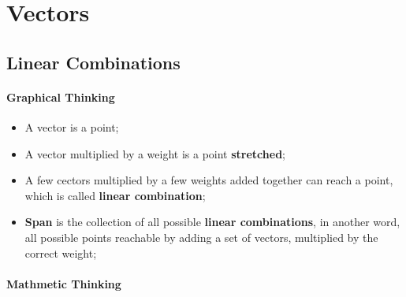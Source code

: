 \section{Vectors}
  
\subsection{Linear Combinations}

\paragraph{Graphical Thinking}
  
  \begin{itemize}
    \item A vector is a point;
    \item A vector multiplied by a weight is a point \textbf{stretched};
    \item A few cectors multiplied by a few weights added together can reach a point,
    which is called \textbf{linear combination};
    \item \textbf{Span} is the collection of all possible \textbf{linear combinations},
    in another word, all possible points reachable by adding a set of vectors,
    multiplied by the correct weight;
  \end{itemize}

  \paragraph{Mathmetic Thinking}

